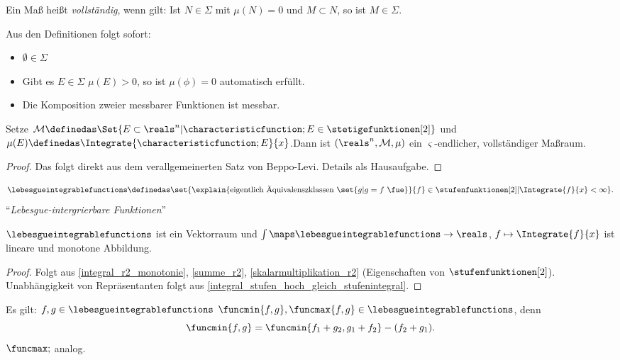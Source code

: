 Ein Maß heißt \emph{vollständig}, wenn gilt: Ist \( N\in \Sigma \) mit \( \mu(N)=0 \) und \( M\subset N \), so ist \( M\in \Sigma \).
\begin{bemerkung*}
  Aus den Definitionen folgt sofort:
  \begin{itemize}
    \item \( \emptyset\in \Sigma \)
    \item Gibt es \( E\in \Sigma \) \sd \( \mu(E)>0 \), so ist \( \mu(\phi)=0 \) automatisch erfüllt.
    \item Die Komposition zweier messbarer Funktionen ist messbar.
  \end{itemize}
\end{bemerkung*}
\begin{satz}
   Setze \( \mathcal{M}\definedas \Set{E\subset \reals^n|\characteristicfunction;{E}\in \stetigefunktionen[2]} \) und \( \mu(E)\definedas \Integrate{\characteristicfunction;{E}}{x} \).Dann ist \( (\reals^n,\mathcal{M},\mu) \) ein \( \varsigma \)-endlicher, vollständiger Maßraum.
\end{satz}
\begin{proof}
  Das folgt direkt aus dem verallgemeinerten Satz von Beppo-Levi. Details als Hausaufgabe.
\end{proof}
\begin{definition*}
  \begin{equation*}
    \lebesgueintegrablefunctions\definedas \set{\explain{\text{eigentlich Äquivalenszklassen }\set{g|g=f \text{ \fue}}}{f}\in \stufenfunktionen[2]|\Integrate{f}{x}<\infty}.
  \end{equation*}
  \enquote{\emph{Lebesgue-intergrierbare Funktionen}}
\end{definition*}
\begin{proposition}\label{lebesgue_integrable_funktionen_vektorraum}
  \( \lebesgueintegrablefunctions \) ist ein Vektorraum und \( \int \maps \lebesgueintegrablefunctions\to \reals \), \( f\mapsto \Integrate{f}{x} \) ist lineare und monotone Abbildung.
\end{proposition}
\begin{proof}
  Folgt aus \ref{integral_r2_monotonie}, \ref{summe_r2}, \ref{skalarmultiplikation_r2} (Eigenschaften von \( \stufenfunktionen[2] \)). Unabhängigkeit von Repräsentanten folgt aus \ref{integral_stufen_hoch_gleich_stufenintegral}.
  
\end{proof}
\begin{bemerkung*}
  Es gilt: \( f,g\in \lebesgueintegrablefunctions \) \timplies \( \funcmin{f,g},\funcmax{f,g}\in \lebesgueintegrablefunctions \), denn
  \begin{equation*}
    \funcmin{f,g}=\funcmin{f_1+g_2,g_1+f_2}-(f_2+g_1).
  \end{equation*}
  \( \funcmax; \) analog.
\end{bemerkung*}
